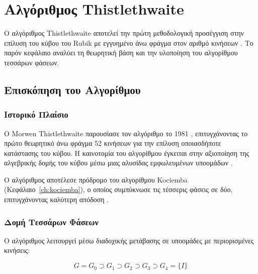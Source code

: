 
\chapter{Αλγόριθμος Thistlethwaite}
\label{ch:thistlethwaite}

Ο αλγόριθμος Thistlethwaite αποτελεί την πρώτη μεθοδολογική προσέγγιση στην επίλυση του κύβου του Rubik με εγγυημένο άνω φράγμα στον αριθμό κινήσεων \cite{scherphuis_thistlethwaite_summary}. Το παρόν κεφάλαιο αναλύει τη θεωρητική βάση και την υλοποίηση του αλγορίθμου τεσσάρων φάσεων.


\section{Επισκόπηση του Αλγορίθμου}
\label{sec:thistlethwaite_overview}

\subsection{Ιστορικό Πλαίσιο}

Ο Morwen Thistlethwaite παρουσίασε τον αλγόριθμο το 1981 \cite{scherphuis_thistlethwaite_summary}, επιτυγχάνοντας το πρώτο θεωρητικό άνω φράγμα 52 κινήσεων για την επίλυση οποιασδήποτε κατάστασης του κύβου. Η καινοτομία του αλγορίθμου έγκειται στην αξιοποίηση της αλγεβρικής δομής του κύβου μέσω μιας αλυσίδας εμφωλευμένων υποομάδων \cite{scherphuis_thistlethwaite_summary,kociemba_twophase_details}.

Ο αλγόριθμος αποτέλεσε πρόδρομο του αλγορίθμου Kociemba (Κεφάλαιο~\ref{ch:kociemba}), ο οποίος συμπύκνωσε τις τέσσερις φάσεις σε δύο, επιτυγχάνοντας καλύτερη απόδοση \cite{kociemba1992close,kociemba_twophase_details}.

\subsection{Δομή Τεσσάρων Φάσεων}

Ο αλγόριθμος λειτουργεί μέσω διαδοχικής μετάβασης σε υποομάδες με περιορισμένες κινήσεις:

\begin{equation}
    G = G_0 \supset G_1 \supset G_2 \supset G_3 \supset G_4 = \{I\}
\end{equation}

